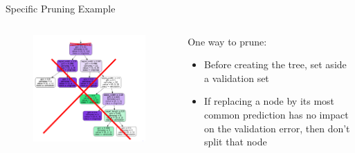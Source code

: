\documentclass[aspectratio=169]{../latex_main/tntbeamer}  %
\begin{document}
	
	\begin{frame}{Specific Pruning Example}
	    \begin{columns}
	        \begin{column}{.5\textwidth}
	              \begin{figure}
            	        \centering
            	        \includegraphics[scale=.35]{Bild54}
	            \end{figure}  
	        \end{column}
	        
	        \begin{column}{.5\textwidth}
	                One way to prune: 
	                \begin{itemize}
	                    \item Before creating the tree, set aside a validation set
	                    \item If replacing a node by its most common prediction has no impact on the validation error, then don’t split that node
	                \end{itemize}
	        \end{column}
	    \end{columns}
	\end{frame}
	
	
	
\end{document}

